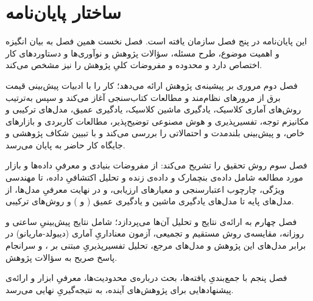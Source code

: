 
\section{ساختار پایان‌نامه}

این پایان‌نامه در پنج فصل سازمان یافته است. فصل نخست  همین فصل  به
بیان انگیزه و اهمیت موضوع، طرح مسئله، سؤالات پژوهش و نوآوری‌ها و دستاوردهای کار
اختصاص دارد و محدوده و مفروضات کلیِ پژوهش را نیز مشخص می‌کند.

فصل دوم مروری بر پیشینه‌ی پژوهش ارائه می‌دهد؛ کار را با ادبیات پیش‌بینی قیمت برق
از مرورهای نظام‌مند و مطالعات کتاب‌سنجی آغاز می‌کند و سپس به‌ترتیب روش‌های آماری
کلاسیک، یادگیری ماشین کلاسیک، یادگیری عمیق، مدل‌های ترکیبی و مکانیزم توجه،
تفسیرپذیری و هوش مصنوعی توضیح‌پذیر، مطالعات کاربردی و بازارهای خاص، و پیش‌بینی
بلندمدت و احتمالاتی را بررسی می‌کند و با تبیین شکاف پژوهشی و جایگاه کار حاضر به
پایان می‌رسد.

فصل سوم روش تحقیق را تشریح می‌کند: از مفروضات بنیادی و معرفیِ داده‌ها و بازار مورد
مطالعه  شامل داده‌ی بنچمارک و داده‌ی زنده  و تحلیل اکتشافیِ داده، تا
مهندسی ویژگی، چارچوب اعتبارسنجی و معیارهای ارزیابی، و در نهایت معرفیِ مدل‌ها، از
مدل‌های پایه تا مدل‌های یادگیری ماشین و یادگیری عمیق ( و ) و
روش‌های ترکیبی.

فصل چهارم به ارائه‌ی نتایج و تحلیل آن‌ها می‌پردازد؛ شامل نتایج پیش‌بینیِ ساعتی و
روزانه، مقایسه‌ی روش مستقیم و تجمیعی، آزمون معناداریِ آماری (دیبولد-ماریانو) در
برابر مدل‌های این پژوهش و مدل‌های مرجع، تحلیل تفسیرپذیریِ مبتنی بر ، و
سرانجام پاسخ صریح به سؤالات پژوهش.

فصل پنجم با جمع‌بندیِ یافته‌ها، بحث درباره‌ی محدودیت‌ها، معرفیِ ابزار
 و ارائه‌ی پیشنهادهایی برای پژوهش‌های آینده، به
نتیجه‌گیریِ نهایی می‌رسد.
